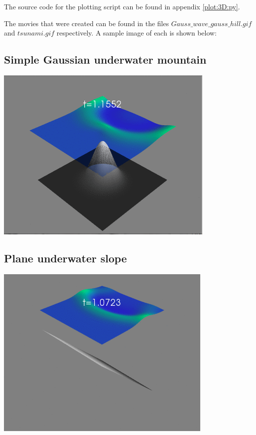\documentclass[twoside]{article}
\begin{document}
The source code for the plotting script can be found in appendix \ref{plot:3D:py}.

The movies that were created can be found in the files $Gauss\_wave\_gauss\_hill.gif$ and $tsunami.gif$ respectively. A sample image of each is shown below:

\subsection{Simple Gaussian underwater mountain}
\begin{center}  %
  \centerline{\includegraphics[width=0.8\linewidth]{gauss.png}}
\end{center}

\subsection{Plane underwater slope}
\begin{center}  %
  \centerline{\includegraphics[width=0.8\linewidth]{tsunami.png}}
\end{center}
\end{document}
